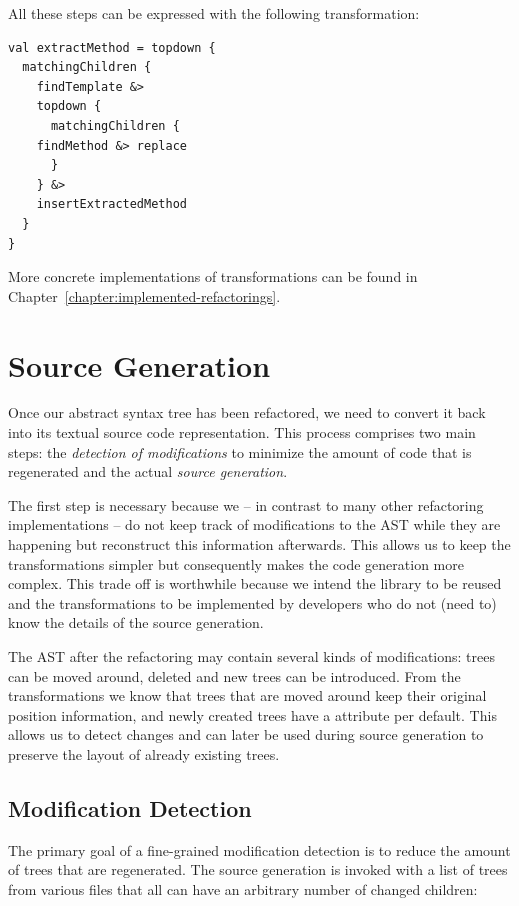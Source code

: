 
All these steps can be expressed with the following transformation:

\begin{lstlisting}
val extractMethod = topdown {
  matchingChildren {
    findTemplate &> 
    topdown {
      matchingChildren {
	findMethod &> replace
      }
    } &> 
    insertExtractedMethod
  }
}
\end{lstlisting}

More concrete implementations of transformations can be found in Chapter~\vref{chapter:implemented-refactorings}.
\newpage
\section{Source Generation}\label{section:source-generation}

Once our abstract syntax tree has been refactored, we need to convert it back into its textual source code representation. This process comprises two main steps: the \textit{detection of modifications} to minimize the amount of code that is regenerated and the actual \textit{source generation}.

The first step is necessary because we -- in contrast to many other refactoring implementations -- do not keep track of modifications to the AST while they are happening but reconstruct this information afterwards. This allows us to keep the transformations simpler but consequently makes the code generation more complex. This trade off is worthwhile because we intend the library to be reused and the transformations to be implemented by developers who do not (need to) know the details of the source generation.

The AST after the refactoring may contain several kinds of modifications: trees can be moved around, deleted and new trees can be introduced. From the transformations we know that trees that are moved around keep their original position information, and newly created trees have a  attribute per default. This allows us to detect changes and can later be used during source generation to preserve the layout of already existing trees. 

\subsection{Modification Detection}

The primary goal of a fine-grained modification detection is to reduce the amount of trees that are regenerated. The source generation is invoked with a list of trees from various files that all can have an arbitrary number of changed children:

